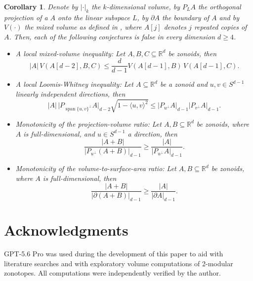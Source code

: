 \documentclass{article}
\newcommand{\R}{\mathbb{R}}
\theoremstyle{theorem}
\newtheorem{corollary}[theorem]{Corollary}
\theoremstyle{remark}
\begin{document}
\begin{corollary}\label{cor:main_cor}
    Denote by $|\cdot |_k$ the $k$-dimensional volume, by $P_{L}A$ the orthogonal projection of a $A$ onto the linear subspace $L$, by $\partial A$ the boundary of $A$ and by $V(\cdot)$ the mixed volume as defined in \citep{fradelizi2024volume}, where $A[j]$ denotes $j$ repeated copies of $A$. Then, each of the following conjectures is \emph{false} in every dimension $d\geq 4$.
    \begin{itemize}
        \item A local mixed-volume inequality: Let $A, B, C \subseteq \R^d$ be zonoids, then
           \[
            |A|\,V(A[d-2],B,C)
            \leq
            \frac{d}{d-1}
            V(A[d-1],B)\,V(A[d-1],C).
            \]
        \item A local Loomis-Whitney inequality: Let $A \subseteq \R^d$ be a zonoid and $u,v \in S^{d-1}$ linearly independent directions, then
            \[
            |A|\,
            \bigl|P_{\operatorname{span}\{u,v\}^{\perp}}A\bigr|_{d-2}
            \sqrt{1-\langle u,v\rangle^2}
            \leq
            \bigl|P_{u^\perp}A\bigr|_{d-1}
            \bigl|P_{v^\perp}A\bigr|_{d-1}.
            \]
        \item Monotonicity of the projection-volume ratio: Let $A, B \subseteq \R^d$ be zonoids, where $A$ is full-dimensional, and $u \in S^{d-1}$ a direction, then
        \[
            \frac{|A+B|}
                 {\bigl|P_{u^\perp}(A+B)\bigr|_{d-1}}
            \geq
            \frac{|A|}
                 {\bigl|P_{u^\perp}A\bigr|_{d-1}}.
        \]
    
        \item Monotonicity of the volume-to-surface-area ratio: Let $A, B \subseteq \R^d$ be zonoids, where $A$ is full-dimensional, then
        \[
            \frac{|A+B|}{|\partial(A+B)|_{d-1}}
            \geq
            \frac{|A|}{|\partial A|_{d-1}}.
        \]
    \end{itemize}
\end{corollary}




\section{Acknowledgments}
GPT-5.6 Pro was used during the development of this paper to aid with literature searches and with exploratory volume computations of 2-modular zonotopes. All computations were independently verified by the author.


{\small
\printbibliography
}
\end{document}
